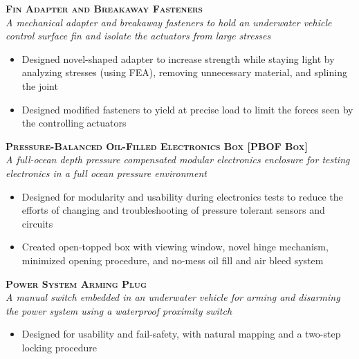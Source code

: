 \documentclass[11pt, letterpaper]{article}
\newcommand{\years}[1]{\marginnote{\footnotesize #1}} %
\begin{document}
  \begin{samepage}
    \years{2016} \textbf{\scshape Fin Adapter and Breakaway Fasteners}\\
    \textit{A mechanical adapter and breakaway fasteners to hold an underwater vehicle control surface fin and isolate the actuators from large stresses}
    \begin{itemize}      
      \item Designed novel-shaped adapter to increase strength while staying light by analyzing stresses (using FEA), removing unnecessary material, and splining the joint
      \item Designed modified fasteners to yield at precise load to limit the forces seen by the controlling actuators
    \end{itemize}
  \end{samepage}

  \begin{samepage}
    \years{2015} \textbf{\scshape Pressure-Balanced Oil-Filled Electronics Box [PBOF Box]}\\
    \textit{A full-ocean depth pressure compensated modular electronics enclosure for testing electronics in a full ocean pressure environment}
    \begin{itemize}      
      \item Designed for modularity and usability during electronics tests to reduce the efforts of changing and troubleshooting of pressure tolerant sensors and circuits
      \item Created open-topped box with viewing window, novel hinge mechanism, minimized opening procedure, and no-mess oil fill and air bleed system
    \end{itemize}
  \end{samepage}

  \begin{samepage}
    \years{2015} \textbf{\scshape Power System Arming Plug}\\
    \textit{A manual switch embedded in an underwater vehicle for arming and disarming the power system using a waterproof proximity switch}
    \begin{itemize}      
      \item Designed for usability and fail-safety, with natural mapping and a two-step locking procedure
    \end{itemize}
  \end{samepage}
\end{document}
